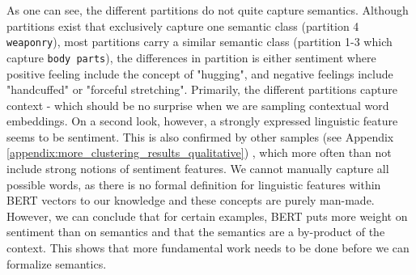 \documentclass[a4paper,12pt,oneside,openright]{report}
\begin{document}
\begin{tcolorbox}
\label{fig:example_arms_negative_crossed}
\end{tcolorbox}

\quad

As one can see, the different partitions do not quite capture semantics.
Although partitions exist that exclusively capture one semantic class (partition 4 \texttt{weaponry}), most partitions carry a similar semantic class (partition 1-3 which capture \texttt{body parts}), the differences in partition is either sentiment where positive feeling include the concept of "hugging", and negative feelings include "handcuffed" or "forceful stretching". 
Primarily, the different partitions capture context - which should be no surprise when we are sampling contextual word embeddings.
On a second look, however, a strongly expressed linguistic feature seems to be sentiment. 
This is also confirmed by other samples (see Appendix \ref{appendix:more_clustering_results_qualitative}) , which more often than not include strong notions of sentiment features.
We cannot manually capture all possible words, as there is no formal definition for linguistic features within BERT vectors to our knowledge and these concepts are purely man-made. 
However, we can conclude that for certain examples, BERT puts more weight on sentiment than on semantics and that the semantics are a by-product of the context.
This shows that more fundamental work needs to be done before we can formalize semantics.
\end{document}
